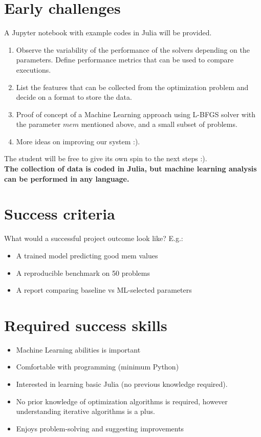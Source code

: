 \documentclass{article}
\begin{document}
\section{Early challenges}

A Jupyter notebook with example codes in Julia will be provided.

\begin{enumerate}
    \item Observe the variability of the performance of the solvers depending on the parameters. Define performance metrics that can be used to compare executions.
    \item List the features that can be collected from the optimization problem and decide on a format to store the data.
    \item Proof of concept of a Machine Learning approach using L-BFGS solver with the parameter $mem$ mentioned above, and a small subset of problems.
    \item More ideas on improving our system :).
\end{enumerate}
The student will be free to give its own spin to the next steps :).\\

\textbf{The collection of data is coded in Julia, but machine learning analysis can be performed in any language.}

\section{Success criteria}

What would a successful project outcome look like? E.g.:
\begin{itemize}
    \item A trained model predicting good mem values
    \item A reproducible benchmark on 50 problems
    \item A report comparing baseline vs ML-selected parameters
\end{itemize}

\section{Required success skills}

\begin{itemize}
    \item Machine Learning abilities is important
    \item Comfortable with programming (minimum Python)
    \item Interested in learning basic Julia (no previous knowledge required).
    \item No prior knowledge of optimization algorithms is required, however understanding iterative algorithms is a plus.
    \item Enjoys problem-solving and suggesting improvements
\end{itemize}



\normalsize
\end{document}

